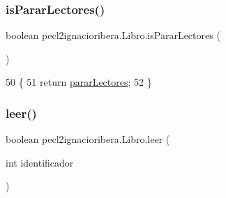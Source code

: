 \subsubsection{\texorpdfstring{is\+Parar\+Lectores()}{isPararLectores()}}
{\footnotesize\ttfamily boolean pecl2ignacioribera.\+Libro.\+is\+Parar\+Lectores (\begin{DoxyParamCaption}{ }\end{DoxyParamCaption})\hspace{0.3cm}{\ttfamily [inline]}}


\begin{DoxyCode}
50                                      \{
51         \textcolor{keywordflow}{return} \mbox{\hyperlink{classpecl2ignacioribera_1_1_libro_a5d69f4d0825673ec1882cfdb390217a9}{pararLectores}};
52     \}
\end{DoxyCode}
\mbox{\label{classpecl2ignacioribera_1_1_libro_ae907d7ff683317468cf2772211b5289c}} 
\subsubsection{\texorpdfstring{leer()}{leer()}}
{\footnotesize\ttfamily boolean pecl2ignacioribera.\+Libro.\+leer (\begin{DoxyParamCaption}\item[{int}]{identificador }\end{DoxyParamCaption})\hspace{0.3cm}{\ttfamily [inline]}}


